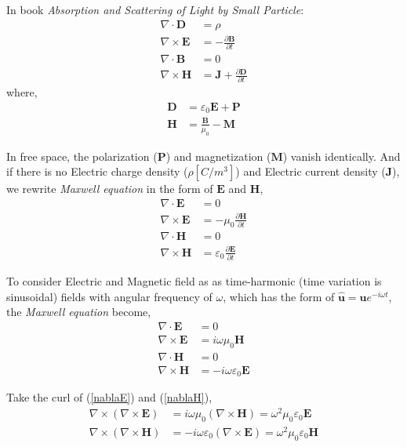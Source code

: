 In book \textit{Absorption and Scattering of Light by Small Particle}:
\begin{align}
    \nabla\cdot\mathbf{D}  &= \rho \\
    \nabla\times\mathbf{E} &= -\frac{\partial\mathbf{B}}{\partial t} \\
    \nabla\cdot\mathbf{B}  &= 0 \\
    \nabla\times\mathbf{H} &= \mathbf{J} + \frac{\partial\mathbf{D}}{\partial t}
\end{align}
where,
\begin{align}
    \mathbf{D} &= \varepsilon_0\mathbf{E} + \mathbf{P} \\
    \mathbf{H} &= \frac{\mathbf{B}}{\mu_0} - \mathbf{M}
\end{align}

In free space, the polarization ($\mathbf{P}$) and magnetization ($\mathbf{M}$) vanish identically. And if there is no Electric charge density ($\rho [C/m^3]$) and Electric current density ($\mathbf{J}$), we rewrite \textit{Maxwell equation} in the form of $\mathbf{E}$ and $\mathbf{H}$,
\begin{align}
    \nabla\cdot\mathbf{E}  &= 0 \\
    \nabla\times\mathbf{E} &= -\mu_0\frac{\partial\mathbf{H}}{\partial t} \\
    \nabla\cdot\mathbf{H}  &= 0 \\
    \nabla\times\mathbf{H} &= \varepsilon_0\frac{\partial\mathbf{E}}{\partial t}
\end{align}

To consider Electric and Magnetic field as as time-harmonic (time variation is sinusoidal) fields with angular frequency of $\omega$, which has the form of $\mathbf{\hat{u}} = \mathbf{u}e^{-i\omega t}$, the \textit{Maxwell equation} become,
\begin{align}
    \nabla\cdot\mathbf{E}  &= 0 \\
    \nabla\times\mathbf{E} &= i\omega\mu_0\mathbf{H} \label{nablaE}\\
    \nabla\cdot\mathbf{H}  &= 0 \\
    \nabla\times\mathbf{H} &= -i\omega\varepsilon_0\mathbf{E} \label{nablaH}
\end{align}

Take the curl of (\ref{nablaE}) and (\ref{nablaH}), 
\begin{align}
    \nabla\times(\nabla\times\mathbf{E}) &= i\omega\mu_0(\nabla\times\mathbf{H}) = \omega^2\mu_0\varepsilon_0\mathbf{E} \\
    \nabla\times(\nabla\times\mathbf{H}) &= -i\omega\varepsilon_0(\nabla\times\mathbf{E}) = \omega^2\mu_0\varepsilon_0\mathbf{H}
\end{align}

